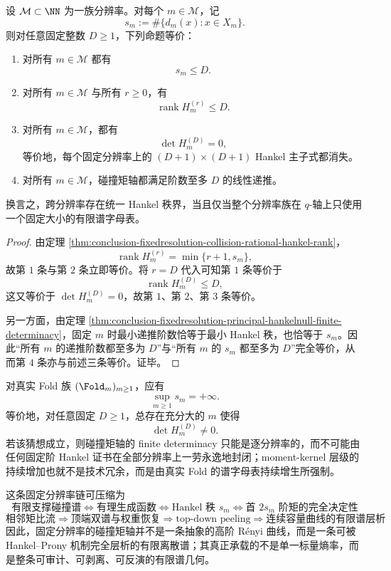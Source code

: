 \begin{theorem}\label{thm:conclusion-fixedresolution-uniform-hankel-rank-alphabet}
设 \(\mathcal M\subset\NN\) 为一族分辨率。对每个 \(m\in\mathcal M\)，记
\[
s_m:=\#\{d_m(x):x\in X_m\}.
\]
则对任意固定整数 \(D\ge 1\)，下列命题等价：
\begin{enumerate}
  \item 对所有 \(m\in\mathcal M\) 都有
  \[
  s_m\le D.
  \]

  \item 对所有 \(m\in\mathcal M\) 与所有 \(r\ge 0\)，有
  \[
  \operatorname{rank}H_m^{(r)}\le D.
  \]

  \item 对所有 \(m\in\mathcal M\)，都有
  \[
  \det H_m^{(D)}=0,
  \]
  等价地，每个固定分辨率上的 \((D+1)\times(D+1)\) Hankel 主子式都消失。

  \item 对所有 \(m\in\mathcal M\)，碰撞矩轴都满足阶数至多 \(D\) 的线性递推。
\end{enumerate}
换言之，跨分辨率存在统一 Hankel 秩界，当且仅当整个分辨率族在 \(q\)-轴上只使用一个固定大小的有限谱字母表。
\end{theorem}
\begin{proof}
由定理 \ref{thm:conclusion-fixedresolution-collision-rational-hankel-rank}，
\[
\operatorname{rank}H_m^{(r)}=\min\{r+1,s_m\},
\]
故第 \(1\) 条与第 \(2\) 条立即等价。将 \(r=D\) 代入可知第 \(1\) 条等价于
\[
\operatorname{rank}H_m^{(D)}\le D,
\]
这又等价于 \(\det H_m^{(D)}=0\)，故第 \(1\)、第 \(2\)、第 \(3\) 条等价。

另一方面，由定理 \ref{thm:conclusion-fixedresolution-principal-hankelnull-finite-determinacy}，固定 \(m\) 时最小递推阶数恰等于最小 Hankel 秩，也恰等于 \(s_m\)。因此“所有 \(m\) 的递推阶数都至多为 \(D\)”与“所有 \(m\) 的 \(s_m\) 都至多为 \(D\)”完全等价，从而第 \(4\) 条亦与前述三条等价。证毕。
\end{proof}

\begin{conjecture}\label{conj:conclusion-fixedresolution-fold-unbounded-hankel-rank}
对真实 Fold 族 \((\Fold_m)_{m\ge 1}\)，应有
\[
\sup_{m\ge 1}s_m=+\infty.
\]
等价地，对任意固定 \(D\ge 1\)，总存在充分大的 \(m\) 使得
\[
\det H_m^{(D)}\neq 0.
\]
若该猜想成立，则碰撞矩轴的 finite determinacy 只能是逐分辨率的，而不可能由任何固定阶 Hankel 证书在全部分辨率上一劳永逸地封闭；moment-kernel 层级的持续增加也就不是技术冗余，而是由真实 Fold 的谱字母表持续增生所强制。
\end{conjecture}

这条固定分辨率链可压缩为
\[
\boxed{
\text{有限支撑碰撞谱}
\Longleftrightarrow
\text{有理生成函数}
\Longleftrightarrow
\text{Hankel 秩 } s_m
\Longleftrightarrow
\text{首 }2s_m\text{ 阶矩的完全决定性}
}
\]
\[
\boxed{
\text{相邻矩比流}
\Longrightarrow
\text{顶端双谱与权重恢复}
\Longrightarrow
\text{top-down peeling}
\Longrightarrow
\text{连续容量曲线的有限谱层析}
}
\]
因此，固定分辨率的碰撞矩轴并不是一条抽象的高阶 Rényi 曲线，而是一条可被 Hankel--Prony 机制完全层析的有限离散谱；其真正承载的不是单一标量熵率，而是整条可审计、可剥离、可反演的有限谱几何。
